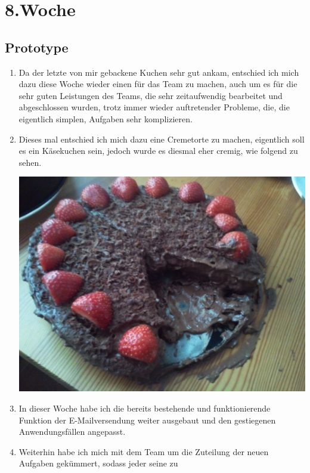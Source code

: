 \chapter{8.\hspace{0.5em}Woche}\label{wo8}

\section{Prototype}\label{wo8_1}

\begin{enumerate}[label={\Roman*)}]
	\item Da der letzte von mir gebackene Kuchen sehr gut ankam, entschied ich mich dazu diese Woche wieder einen f\"ur das
Team zu machen, auch um es f\"ur die sehr guten Leistungen des Teams, die sehr zeitaufwendig bearbeitet und abgeschlossen wurden,
trotz immer wieder auftretender Probleme, die, die eigentlich simplen, Aufgaben sehr komplizieren.
	\item Dieses mal entschied ich mich dazu eine Cremetorte zu machen, eigentlich soll es ein K\"asekuchen sein, jedoch
wurde es diesmal eher cremig, wie folgend zu sehen.
\begin{center}
	\includegraphics[width=17cm]{img/2012-06-07_10-44-10}
\end{center}
	\item In dieser Woche habe ich die bereits bestehende und funktionierende Funktion der E-Mailversendung weiter ausgebaut
und den gestiegenen Anwendungsf\"allen angepasst.
	\item Weiterhin habe ich mich mit dem Team um die Zuteilung der neuen Aufgaben gek\"ummert, sodass jeder seine zu

\end{enumerate}
